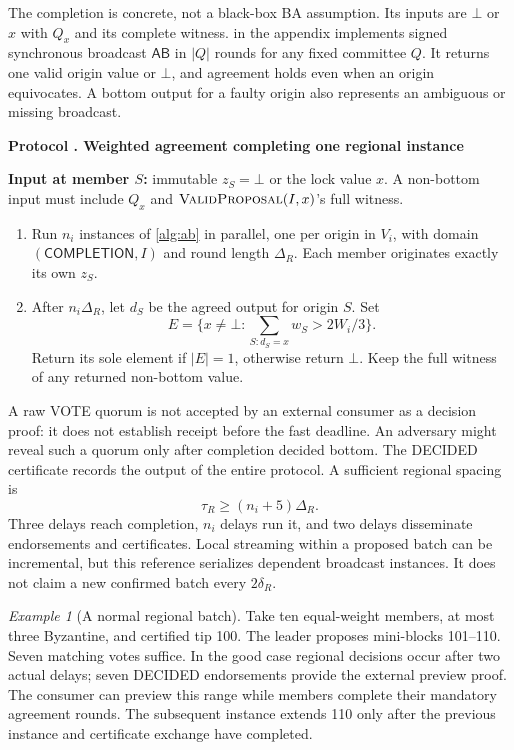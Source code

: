 \documentclass[11pt,a4paper,onecolumn]{article}
\newcommand{\AB}{\mathsf{AB}}
\newcommand{\botv}{\bot}
\newcommand{\Tag}[1]{\mathsf{#1}}
\newcommand{\Proc}[1]{\textnormal{\textsc{#1}}}
\theoremstyle{remark}\newtheorem{example}[definition]{Example}
\newcounter{protocol}
\newenvironment{protocol}[2]{\refstepcounter{protocol}\label{#1}\begin{mdframed}[nobreak=true,linewidth=.6pt,skipabove=10pt,skipbelow=10pt,innertopmargin=8pt,innerbottommargin=8pt]\small\raggedright\noindent\textbf{Protocol \theprotocol. #2}\par\smallskip}{\end{mdframed}}
\begin{document}
The completion is concrete, not a black-box BA assumption. Its inputs are
$\botv$ or $x$ with $Q_x$ and its complete witness.  in the appendix
implements signed synchronous broadcast $\AB$ in $|Q|$ rounds for any fixed
committee $Q$. It returns one valid origin value or $\botv$, and agreement
holds even when an origin equivocates. A bottom output for a faulty origin
also represents an ambiguous or missing broadcast.

\begin{protocol}{alg:ba}{Weighted agreement completing one regional instance}
\textbf{Input at member $S$:} immutable $z_S=\botv$ or the lock value $x$.
A non-bottom input must include $Q_x$ and $\Proc{ValidProposal}(I,x)$'s full witness.
\begin{enumerate}[label=\textbf{B\arabic*.}]
\item Run $n_i$ instances of \cref{alg:ab} in parallel, one per origin in $V_i$,
with domain $(\Tag{COMPLETION},I)$ and round length $\Delta_R$.
Each member originates exactly its own $z_S$.
\item After $n_i\Delta_R$, let $d_S$ be the agreed output for origin $S$.
Set
\[
 E=\{x\neq\botv:\textstyle\sum_{S:d_S=x}w_S>2W_i/3\}.
\]
Return its sole element if $|E|=1$, otherwise return $\botv$.
Keep the full witness of any returned non-bottom value.
\end{enumerate}
\end{protocol}

A raw VOTE quorum is not accepted by an external consumer as a decision proof:
it does not establish receipt before the fast deadline. An adversary might
reveal such a quorum only after completion decided bottom. The DECIDED
certificate records the output of the entire protocol.
A sufficient regional spacing is
\begin{equation}\label{eq:spacing}
 \tau_R\geq(n_i+5)\Delta_R.
\end{equation}
Three delays reach completion, $n_i$ delays run it, and two delays disseminate
endorsements and certificates. Local streaming within a proposed batch can be
incremental, but this reference serializes dependent broadcast instances.
It does not claim a new confirmed batch every $2\delta_R$.

\begin{example}[A normal regional batch]
Take ten equal-weight members, at most three Byzantine, and certified tip 100.
The leader proposes mini-blocks 101--110. Seven matching votes suffice. In the
good case regional decisions occur after two actual delays; seven DECIDED
endorsements provide the external preview proof. The consumer can preview this
range while members complete their mandatory agreement rounds. The subsequent
instance extends 110 only after the previous instance and certificate exchange
have completed.
\end{example}
\end{document}
